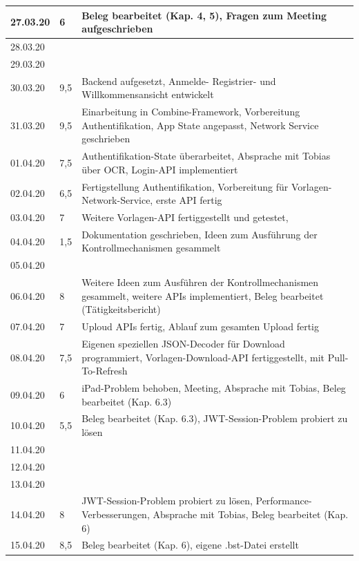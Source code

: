 \documentclass[notables, nomenclature, oneside, 150]{HSMW-Thesis}
\begin{document}
\begin{longtable}{
		|p{}
		|p{}
		|p{}|
	}
        27.03.20 & 6 & Beleg bearbeitet (Kap. 4, 5), Fragen zum Meeting aufgeschrieben \\ \hline
        28.03.20 &  &  \\ \hline
        29.03.20 &  &  \\ \hline
        \hline
        30.03.20 & 9,5 & Backend aufgesetzt, Anmelde- Registrier- und Willkommensansicht entwickelt \\ \hline
        31.03.20 & 9,5 & Einarbeitung in  Combine-Framework, Vorbereitung Authentifikation, App State angepasst, Network Service geschrieben \\ \hline
        01.04.20 & 7,5 & Authentifikation-State überarbeitet, Absprache mit Tobias über OCR, Login-API implementiert \\ \hline
        02.04.20 & 6,5 & Fertigstellung Authentifikation, Vorbereitung für Vorlagen-Network-Service, erste API fertig \\ \hline
        03.04.20 & 7 & Weitere Vorlagen-API fertiggestellt und getestet,  \\ \hline
        04.04.20 & 1,5 & Dokumentation geschrieben, Ideen zum Ausführung der Kontrollmechanismen gesammelt  \\ \hline
        05.04.20 &  &  \\ \hline
        \hline
        06.04.20 & 8 & Weitere Ideen zum Ausführen der Kontrollmechanismen gesammelt, weitere APIs implementiert, Beleg bearbeitet (Tätigkeitsbericht) \\ \hline
        07.04.20 & 7 & Uploud APIs fertig, Ablauf zum gesamten Upload fertig \\ \hline
        08.04.20 & 7,5 & Eigenen speziellen JSON-Decoder für Download programmiert, Vorlagen-Download-API fertiggestellt, mit Pull-To-Refresh \\ \hline
        09.04.20 & 6 & iPad-Problem behoben, Meeting, Absprache mit Tobias, Beleg bearbeitet (Kap. 6.3) \\ \hline
        10.04.20 & 5,5 & Beleg bearbeitet (Kap. 6.3), JWT-Session-Problem probiert zu lösen \\ \hline
        11.04.20 &  &  \\ \hline
        12.04.20 &  &  \\ \hline
        \hline
        13.04.20 &  &  \\ \hline
        14.04.20 & 8 & JWT-Session-Problem probiert zu lösen, Performance-Verbesserungen, Absprache mit Tobias, Beleg bearbeitet (Kap. 6) \\ \hline
        15.04.20 & 8,5 & Beleg bearbeitet (Kap. 6), eigene .bst-Datei erstellt \\ \hline

\end{longtable}
\end{document}
